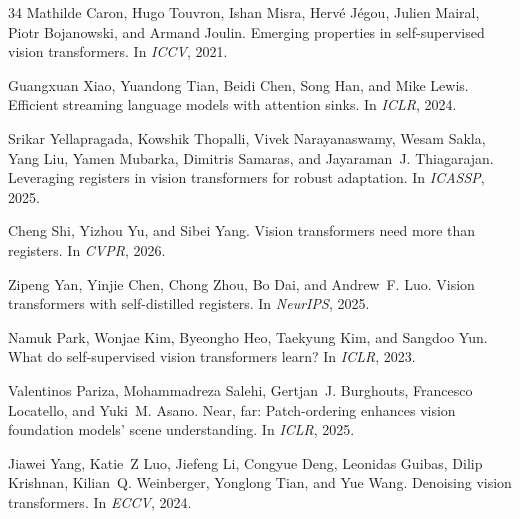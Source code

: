 \documentclass[10pt,twocolumn,letterpaper]{article}
\begin{document}
{\begin{thebibliography}{34}
Mathilde Caron, Hugo Touvron, Ishan Misra, Herv{\'e} J{\'e}gou, Julien Mairal,
  Piotr Bojanowski, and Armand Joulin.
\newblock Emerging properties in self-supervised vision transformers.
\newblock In \emph{ICCV}, 2021.

Guangxuan Xiao, Yuandong Tian, Beidi Chen, Song Han, and Mike Lewis.
\newblock Efficient streaming language models with attention sinks.
\newblock In \emph{ICLR}, 2024.

Srikar Yellapragada, Kowshik Thopalli, Vivek Narayanaswamy, Wesam Sakla, Yang
  Liu, Yamen Mubarka, Dimitris Samaras, and Jayaraman~J. Thiagarajan.
\newblock Leveraging registers in vision transformers for robust adaptation.
\newblock In \emph{ICASSP}, 2025.

Cheng Shi, Yizhou Yu, and Sibei Yang.
\newblock Vision transformers need more than registers.
\newblock In \emph{CVPR}, 2026.

Zipeng Yan, Yinjie Chen, Chong Zhou, Bo Dai, and Andrew~F. Luo.
\newblock Vision transformers with self-distilled registers.
\newblock In \emph{NeurIPS}, 2025.

Namuk Park, Wonjae Kim, Byeongho Heo, Taekyung Kim, and Sangdoo Yun.
\newblock What do self-supervised vision transformers learn?
\newblock In \emph{ICLR}, 2023.

Valentinos Pariza, Mohammadreza Salehi, Gertjan~J. Burghouts, Francesco
  Locatello, and Yuki~M. Asano.
\newblock Near, far: Patch-ordering enhances vision foundation models' scene
  understanding.
\newblock In \emph{ICLR}, 2025.

Jiawei Yang, Katie~Z Luo, Jiefeng Li, Congyue Deng, Leonidas Guibas, Dilip
  Krishnan, Kilian~Q. Weinberger, Yonglong Tian, and Yue Wang.
\newblock Denoising vision transformers.
\newblock In \emph{ECCV}, 2024.


\end{thebibliography}}
\end{document}
